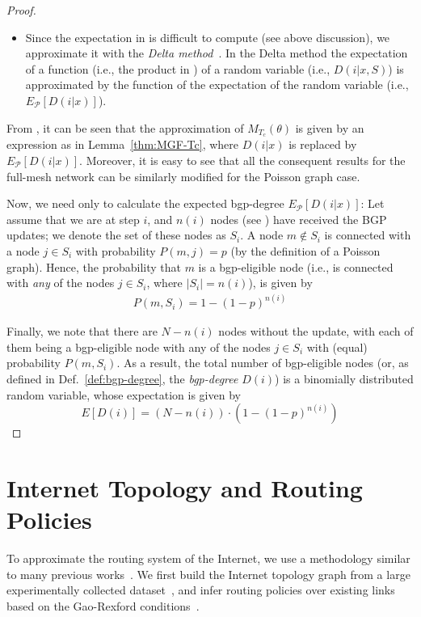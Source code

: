 \begin{proof}
\begin{itemize}
\item Since the expectation in  is difficult to compute (see above discussion), we approximate it with the \textit{Delta method}~\cite{Oehlert1992}. In the Delta method the expectation of a function (i.e., the product in ) of a random variable (i.e., $D(i|x,S)$) is approximated by the function of the expectation of the random variable (i.e., $E_{\mathcal{P}}[D(i|x)]$).
\end{itemize}

From , it can be seen that the approximation of $M_{T_{c}}(\theta)$ is given by an expression as in Lemma~\ref{thm:MGF-Tc}, where $D(i|x)$ is replaced by $E_{\mathcal{P}}[D(i|x)]$. Moreover, it is easy to see that all the consequent results for the full-mesh network can be similarly modified for the Poisson graph case.

Now, we need only to calculate the expected bgp-degree $E_{\mathcal{P}}[D(i|x)]$: Let assume that we are at step $i$, and $n(i)$ nodes (see ) have received the BGP updates; we denote the set of these nodes as $S_{i}$. A node $m\notin S_{i}$ is connected with a node $j\in S_{i}$ with probability $P(m,j)=p$ (by the definition of a Poisson graph). Hence, the probability that $m$ is a bgp-eligible node (i.e., is connected with \textit{any} of the nodes $j\in S_{i}$, where $|S_{i}| = n(i)$), is given by
\begin{align}
P(m,S_{i}) = 1- (1-p)^{n(i)}
\end{align}

Finally, we note that there are $N-n(i)$ nodes without the update, with each of them being a bgp-eligible node with any of the nodes $j\in S_{i}$ with (equal) probability $P(m,S_{i})$. As a result, the total number of bgp-eligible nodes (or, as defined in Def.~\ref{def:bgp-degree}, the \textit{bgp-degree} $D(i)$) is a binomially distributed random variable, whose expectation is given by 
\begin{equation}
E[D(i)] = (N-n(i))\cdot (1-(1-p)^{n(i)})
\end{equation}
\end{proof}





\section{Internet Topology and Routing Policies}\label{sec:simulations-internet}
To approximate the routing system of the Internet, we use a methodology similar to many previous works~\cite{Let-the-market-BGP-sigcomm-2011,how-secure-goldberg-ComNet-2014,Jumpstarting-BGP-sigcomm-2016,RPKI-deployment-2016}. We first build the Internet topology graph from a large experimentally collected dataset~\cite{AS-relationships-dataset}, and infer routing policies over existing links based on the Gao-Rexford conditions~\cite{stable-internet-routing-TON-2001}. 


